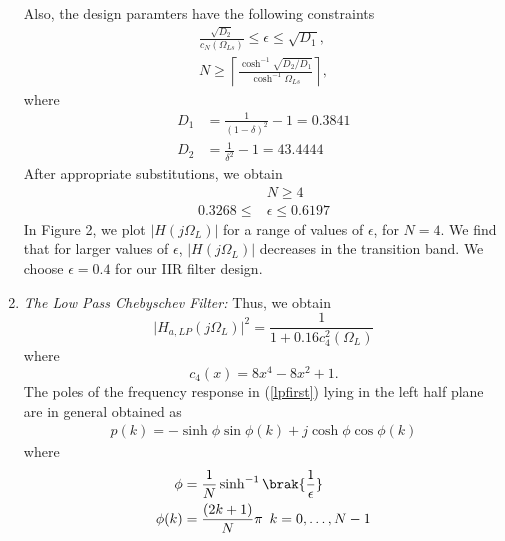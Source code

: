\documentclass{article}
\begin{document}
\begin{enumerate}
\begin{equation}
\end{equation}
Also, the design paramters have the following constraints
\begin{eqnarray}
\label{lpdesign}
\frac{\sqrt{D_2}}{c_N(\Omega_{Ls})} \leq \epsilon \leq \sqrt{D_1}, \nonumber \\
N \geq \left\lceil \frac{\cosh^{-1}\sqrt{D_2/D_1}}{\cosh^{-1}\Omega_{Ls}} \right\rceil,
\end{eqnarray}
where 
\begin{align}
    D_1 &= \frac{1}{(1 - \delta)^2}-1 = 0.3841 \\
    D_2 &= \frac{1}{\delta^2} - 1 = 43.4444
\end{align}
After appropriate substitutions,
we obtain 
\begin{align}
    &N \geq 4 \\
    0.3268 \leq &\epsilon \leq 0.6197
\end{align}
In Figure 2, we plot $\vert H(j\Omega_L)\vert$ for a range of values of $\epsilon$, for $N = 4$.  We find that for larger values of $\epsilon$, $|H(j\Omega_L)|$ decreases in the transition band.  We choose $\epsilon = 0.4$  for our IIR filter design.
\item {\em The Low Pass Chebyschev Filter:} Thus, we obtain
\begin{equation}
\label{lpsqfinal}
\vert H_{a,LP}(j\Omega_L)\vert^2 = \frac{1}{1 + 0.16c_4^2(\Omega_L)}
\end{equation}
where
\begin{equation}
c_4(x) = 8x^4 - 8x^2 + 1.	
\end{equation}
The poles of the frequency response in (\ref{lpfirst}) lying in the left half plane are in general obtained as 
\begin{align}
    p(k) = -\sinh{\phi}\sin{\phi(k)}+j\cosh{\phi}\cos{\phi(k)}
\end{align}
where
\begin{align}
    \phi &= \frac{1}{N}\sinh^{-1}{\brak{\frac{1}{\epsilon}}} \\
    \phi(k) &= \frac{(2k+1)}{N}\pi \hspace{5pt} k = 0, \dots, N-1
\end{align}


\end{enumerate}
\end{document}
